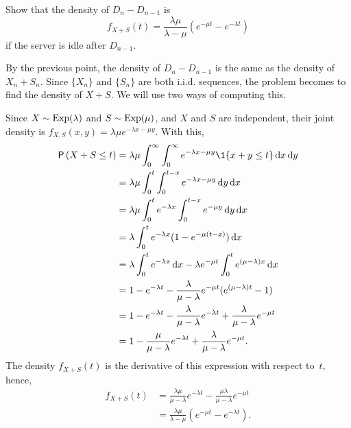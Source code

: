 \begin{extra}
Show that the density of $D_{n} - D_{n-1}$ is
    \begin{equation*}
    f_{X+S}(t) = \frac{\lambda \mu}{\lambda - \mu} (e^{-\mu t} - e^{-\lambda t})
    \end{equation*}
if the server is idle after $D_{n-1}$.
    \begin{solution}
      By the previous point, the density of $D_{n} - D_{n-1}$ is the
      same as the density of $X_n + S_n$.  Since $\{X_n\}$ and $\{S_n\}$ are both i.i.d. sequences, the problem becomes to find the density of $X+S$.  We will use two ways of computing this. 

Since $X\sim \operatorname{Exp}(\lambda)$ and $S\sim\operatorname{Exp}(\mu)$, and $X$ and $S$ are independent, their joint density is $f_{X,S}(x,y) = \lambda \mu e^{-\lambda x - \mu y}$. With this,
  \begin{align*}
\P{X+S\leq t } 
&= \lambda \mu \int_0^\infty \int_0^\infty e^{-\lambda x - \mu y} \1{x+y\leq t} \d x \d y \\
&= \lambda \mu \int_0^t \int_0^{t-x} e^{-\lambda x - \mu y} \d y \d x \\
&= \lambda \mu \int_0^t e^{-\lambda x} \int_0^{t-x} e^{- \mu y} \d y \d x \\
&= \lambda \int_0^t e^{-\lambda x} (1-e^{- \mu (t-x)} ) \d x  \\
&= \lambda \int_0^t e^{-\lambda x}  \d x - \lambda e^{-\mu t} \int_0^t e^{(\mu-\lambda) x} \d x \\
&= 1- e^{-\lambda t} - \frac{\lambda}{\mu-\lambda} e^{-\mu t} ( e^{(\mu-\lambda) t} -1) \\
&= 1- e^{-\lambda t} - \frac{\lambda}{\mu-\lambda} e^{-\lambda t} + \frac{\lambda}{\mu-\lambda} e^{-\mu t} \\ 
&= 1 - \frac{\mu}{\mu-\lambda} e^{-\lambda t} + \frac{\lambda}{\mu-\lambda} e^{-\mu t}. \\
  \end{align*}
The density $f_{X+S}(t)$ is the derivative of this expression with respect to~$t$, hence,
\begin{align*}
  f_{X+S}(t) 
&= \frac{\lambda\mu}{\mu-\lambda} e^{-\lambda t}  - \frac{\mu \lambda}{\mu-\lambda} e^{-\mu t} \\
&= \frac{\lambda\mu}{\lambda -\mu}(e^{-\mu t} - e^{-\lambda t}). \\
\end{align*}


\end{solution}
\end{extra}

